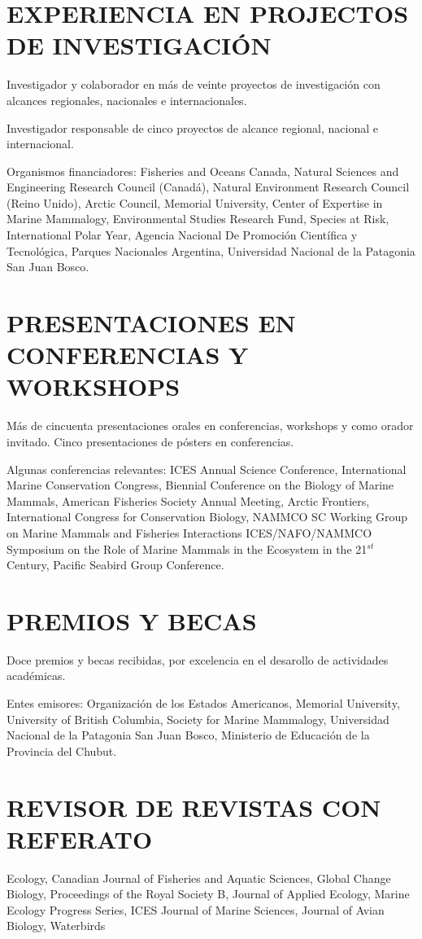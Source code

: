 \documentclass{res}
\begin{document}
\begin{resume}
\section{EXPERIENCIA EN PROJECTOS DE INVESTIGACI\'ON}


Investigador y colaborador en m\'as de veinte proyectos de investigaci\'on con alcances regionales, nacionales e internacionales. 


Investigador responsable de cinco proyectos de alcance regional, nacional e internacional.  

Organismos financiadores: Fisheries and Oceans Canada, Natural Sciences and Engineering Research Council (Canad\'{a}), Natural Environment Research Council (Reino Unido), Arctic Council, Memorial University, Center of Expertise in Marine Mammalogy, Environmental Studies Research Fund, Species at Risk, International Polar Year, Agencia Nacional De Promoci\'on Cient\'ifica y Tecnol\'ogica, Parques Nacionales Argentina, Universidad Nacional de la Patagonia San Juan Bosco.



\section{PRESENTACIONES EN CONFERENCIAS Y WORKSHOPS}


M\'as de cincuenta presentaciones orales en conferencias, workshops y como orador invitado. Cinco presentaciones de p\'osters en conferencias.

Algunas conferencias relevantes: ICES Annual Science Conference,  International Marine Conservation Congress, Biennial Conference on the Biology of Marine Mammals, American Fisheries Society Annual Meeting, Arctic Frontiers, International Congress for Conservation Biology, NAMMCO SC Working Group on Marine Mammals and Fisheries Interactions ICES/NAFO/NAMMCO Symposium on the Role of Marine Mammals in the Ecosystem in the 21$^{st}$ Century, Pacific Seabird Group Conference.



\section{PREMIOS Y BECAS}
Doce premios y becas recibidas, por excelencia en el desarollo de actividades acad\'emicas. 

Entes emisores: Organizaci\'on de los Estados Americanos, Memorial University, University of British Columbia, Society for Marine Mammalogy, Universidad Nacional de la Patagonia San Juan Bosco, Ministerio de Educaci\'on de la Provincia del Chubut.



\section{REVISOR DE REVISTAS CON REFERATO}

Ecology, Canadian Journal of Fisheries and Aquatic Sciences, Global Change Biology, Proceedings of the Royal Society B, Journal of Applied Ecology, Marine Ecology Progress Series, ICES Journal of Marine Sciences, Journal of Avian Biology, Waterbirds


\end{resume}
\end{document}
